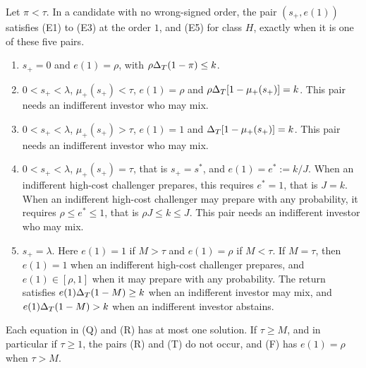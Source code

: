 \begin{lemma}\label{lem:a4-high}
Let \(\pi<\tau\). In a candidate with no wrong-signed order, the pair \((s_+,e(1))\) satisfies (E1) to (E3) at the
order \(1\), and (E5) for class \(H\), exactly when it is one of these five pairs.
\begin{enumerate}[leftmargin=2.5em]
\item[(N)] \(s_+=0\) and \(e(1)=\rho\), with \(\rho\Delta_T(1-\pi)\le k\).
\item[(Q)] \(0<s_+<\lambda\), \(\mu_+(s_+)<\tau\), \(e(1)=\rho\) and \(\rho\Delta_T[1-\mu_+(s_+)]=k\). This pair needs an
indifferent investor who may mix.
\item[(R)] \(0<s_+<\lambda\), \(\mu_+(s_+)>\tau\), \(e(1)=1\) and \(\Delta_T[1-\mu_+(s_+)]=k\). This pair needs an
indifferent investor who may mix.
\item[(T)] \(0<s_+<\lambda\), \(\mu_+(s_+)=\tau\), that is \(s_+=s^*\), and \(e(1)=e^*:=k/J\). When an indifferent
high-cost challenger prepares, this requires \(e^*=1\), that is \(J=k\). When an indifferent high-cost challenger
may prepare with any probability, it requires \(\rho\le e^*\le1\), that is \(\rho J\le k\le J\). This pair needs an
indifferent investor who may mix.
\item[(F)] \(s_+=\lambda\). Here \(e(1)=1\) if \(M>\tau\) and \(e(1)=\rho\) if \(M<\tau\). If \(M=\tau\), then \(e(1)=1\)
when an indifferent high-cost challenger prepares, and \(e(1)\in[\rho,1]\) when it may prepare with any probability.
The return satisfies \(e(1)\Delta_T(1-M)\ge k\) when an indifferent investor may mix, and \(e(1)\Delta_T(1-M)>k\) when an
indifferent investor abstains.
\end{enumerate}
Each equation in (Q) and (R) has at most one solution. If \(\tau\ge M\), and in particular if \(\tau\ge1\), the pairs
(R) and (T) do not occur, and (F) has \(e(1)=\rho\) when \(\tau>M\).
\end{lemma}

